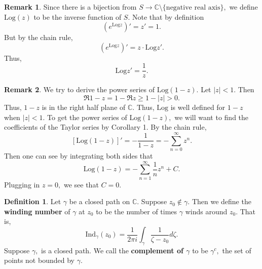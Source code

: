 \documentclass[10pt, oneside]{article}
\newcommand{\bbC}{\mathbb{C}}
\newcommand{\Ind}{\text{Ind}}
\newcommand{\sm}{\setminus}
\theoremstyle{definition}
\newtheorem{defn}{Definition}
\newtheorem{rem}{Remark}
\begin{document}
\begin{rem}
    Since there is a bijection from $S \to \bbC\sm\{\text{negative real axis}\},$ we define $\text{Log}(z)$ to be the inverse function of $S.$ Note that by definition
    \[\left(e^{\text{Log}z}\right)' = z' = 1.\] But by the chain rule,
    \[\left(e^{\text{Log}z}\right)' = z \cdot {\text{Log}z}'.\] Thus, 
    \[{\text{Log}z}' = \frac{1}{z}.\]
\end{rem}
\begin{rem}
    We try to derive the power series of $\text{Log}(1-z).$ Let $|z| < 1.$ Then 
    \[\Re{1-z}  = 1 - \Re{z} \geq 1 - |z| >0 .\] Thus, $1-z$ is in the right half plane of $\bbC.$ Thus, $\text{Log}$ is well defined for $1-z$ when $|z| < 1.$ To get the power series of $\text{Log}(1-z),$ we will want to find the coefficients of the Taylor series by Corollary 1. By the chain rule, 
    \[[\text{Log}(1-z)]' = - \frac{1}{1-z} = -\sum_{n=0}^\infty z^n.\] Then one can see by integrating both sides that
    \[\text{Log}(1-z) = - \sum_{n=1}^\infty \frac{1}{n}z^n  + C.\] Plugging in $z = 0,$ we see that $C = 0. $
\end{rem}
\begin{defn}
    Let $\gamma$ be a closed path on $\bbC.$ Suppose $z_0 \notin \gamma.$ Then we define the \textbf{winding number} of $\gamma$ at $z_0$ to be the number of times $\gamma$ winds around $z_0.$ That is,
    \[\Ind_\gamma(z_0) = \frac{1}{2\pi i}\int_\gamma\frac{1}{\zeta - z_0}d\zeta.\] Suppose $\gamma,$ is a closed path. We call the \textbf{complement of  $\gamma$} to be $\gamma^c,$ the set of points not bounded by $\gamma.$

\end{defn}
\end{document}
